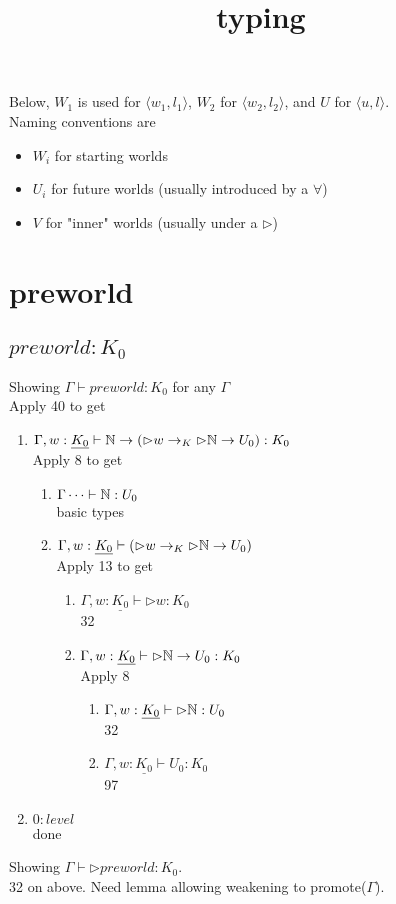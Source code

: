 \documentclass{article}
\title{typing}
\begin{document}
\maketitle
Below, $W_1$ is used for $ \langle w_1, l_1 \rangle$, $W_2$ for $ \langle w_2, l_2 \rangle$, and $U$ for $ \langle u, l \rangle$.\\
Naming conventions are
\begin{itemize}
    \item $W_i$ for starting worlds
    \item $U_i$ for future worlds (usually introduced by a $\forall$)
    \item $V$ for "inner" worlds (usually under a $\rhd$)
\end{itemize}

\section*{preworld}
\subsection{$preworld: K_0$}
Showing $\Gamma \vdash preworld: K_0$ for any $\Gamma$\\
Apply 40 to get
\begin{enumerate}
    \item $\Gamma, w: \underline{K_0} \vdash 
    \mathbb{N} \rightarrow (\rhd w \rightarrow_K \rhd \mathbb{N} \rightarrow U_0) : K
    _0$\\
    Apply 8 to get
    \begin{enumerate}
        \item $\Gamma \dots \vdash \mathbb{N} : U_0$\\
        basic types
        \item $\Gamma, w: \underline{K_0} \vdash (\rhd w \rightarrow_K \rhd \mathbb{N} \rightarrow U_0)$\\
        Apply 13 to get
        \begin{enumerate}
            \item $\Gamma, w: \underline{K_0} \vdash \rhd w :K_0$\\
            32
            \item $\Gamma, w: \underline{K_0} \vdash \rhd \mathbb{N} \rightarrow U_0 : K_0$\\
            Apply 8 
            \begin{enumerate}
                \item $\Gamma, w: \underline{K_0} \vdash \rhd \mathbb{N} : U_0$\\
                32
                \item $\Gamma, w: \underline{K_0} \vdash U_0 : K_0$\\
                97
            \end{enumerate}
        \end{enumerate}
    \end{enumerate}
    \item $0: level$\\
    done
\end{enumerate}
Showing $\Gamma \vdash \rhd preworld : K_0$.\\
32 on above. Need lemma allowing weakening to promote($\Gamma$).
\end{document}
